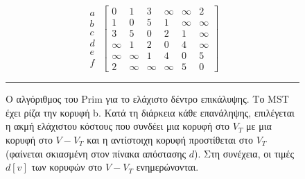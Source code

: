 \documentclass[12pt,a4paper]{article}
\begin{document}
\begin{figure}[ht]
\begin{minipage}{0.45\textwidth}
\[
\begin{array}{c}
a \\ b \\ c \\ d \\ e \\ f
\end{array}
\;
\left[
\begin{array}{cccccc}
0 & 1 & 3 & \infty & \infty & 2 \\
1 & 0 & 5 & 1 & \infty & \infty \\
3 & 5 & 0 & 2 & 1 & \infty \\
\infty & 1 & 2 & 0 & 4 & \infty \\
\infty & \infty & 1 & 4 & 0 & 5 \\
2 & \infty & \infty & \infty & 5 & 0
\end{array}
\right]
\]
\vspace{1cm}
\end{minipage}

\vspace{0.3cm}
\noindent\rule{\textwidth}{0.2pt}

\caption{Ο αλγόριθμος του \foreignlanguage{english}{Prim} για το ελάχιστο δέντρο επικάλυψης. Το \foreignlanguage{english}{MST} έχει ρίζα την κορυφή b. Κατά τη διάρκεια κάθε επανάληψης, επιλέγεται η ακμή ελάχιστου κόστους που συνδέει μια κορυφή στο $V_T$ με μια κορυφή στο $V-V_T$ και η αντίστοιχη κορυφή προστίθεται στο $V_T$ (φαίνεται σκιασμένη στον πίνακα απόστασης $d$). Στη συνέχεια, οι τιμές $d[v]$ των κορυφών στο $V-V_T$ ενημερώνονται.}
\label{fig:graph5}
\end{figure}
\vspace{0.5cm}
\end{document}
